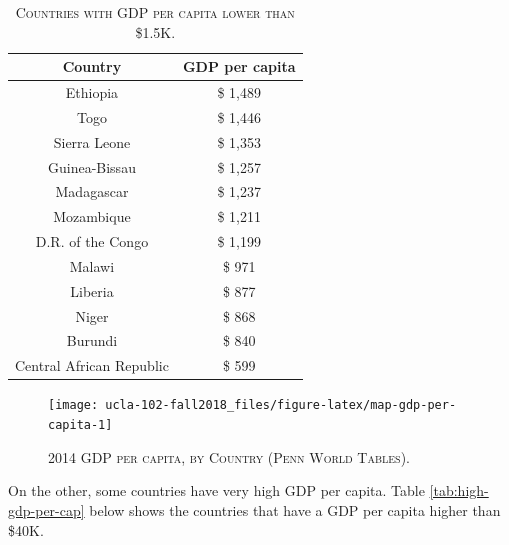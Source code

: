 \documentclass[]{book}
\theoremstyle{definition}
\theoremstyle{definition}
\theoremstyle{definition}
\theoremstyle{remark}
\begin{document}
\begin{table}

\caption{\label{tab:low-gdp-per-cap}\textsc{Countries with GDP per capita lower than
\$1.5K.}}
\centering
\begin{tabular}[t]{cc}
\toprule
Country & GDP per capita\\
\midrule
Ethiopia & \$ 1,489\\
Togo & \$ 1,446\\
Sierra Leone & \$ 1,353\\
Guinea-Bissau & \$ 1,257\\
Madagascar & \$ 1,237\\
\addlinespace
Mozambique & \$ 1,211\\
D.R. of the Congo & \$ 1,199\\
Malawi & \$ 971\\
Liberia & \$ 877\\
Niger & \$ 868\\
\addlinespace
Burundi & \$ 840\\
Central African Republic & \$ 599\\
\bottomrule
\end{tabular}
\end{table}




\begin{figure}

{\centering \texttt{[image: ucla-102-fall2018\_files/figure-latex/map-gdp-per-capita-1]} 

}

\caption{\textsc{2014 GDP per capita, by Country (Penn
World Tables)}.}\label{fig:map-gdp-per-capita}
\end{figure}

On the other, some countries have very high GDP per capita. Table
\ref{tab:high-gdp-per-cap} below shows the countries that have a GDP per
capita higher than \$40K.
\end{document}
